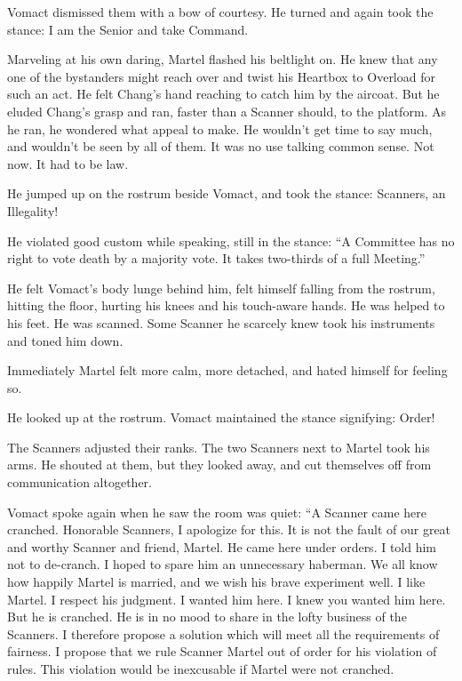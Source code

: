 Vomact dismissed them with a bow of courtesy. He turned and again took the stance: I am the Senior and take Command.

Marveling at his own daring, Martel flashed his beltlight on. He knew that any one of the bystanders might reach over and twist his Heartbox to Overload for such an act. He felt Chang's hand reaching to catch him by the aircoat. But he eluded Chang's grasp and ran, faster than a Scanner should, to the platform. As he ran, he wondered what appeal to make. He wouldn't get time to say much, and wouldn't be seen by all of them. It was no use talking common sense. Not now. It had to be law.

He jumped up on the rostrum beside Vomact, and took the stance: Scanners, an Illegality!

He violated good custom while speaking, still in the stance: ``A Committee has no right to vote death by a majority vote. It takes two-thirds of a full Meeting.''

He felt Vomact's body lunge behind him, felt himself falling from the rostrum, hitting the floor, hurting his knees and his touch-aware hands. He was helped to his feet. He was scanned. Some Scanner he scarcely knew took his instruments and toned him down.

Immediately Martel felt more calm, more detached, and hated himself for feeling so.

He looked up at the rostrum. Vomact maintained the stance signifying: Order!

The Scanners adjusted their ranks. The two Scanners next to Martel took his arms. He shouted at them, but they looked away, and cut themselves off from communication altogether.

Vomact spoke again when he saw the room was quiet: ``A Scanner came here cranched. Honorable Scanners, I apologize for this. It is not the fault of our great and worthy Scanner and friend, Martel. He came here under orders. I told him not to de-cranch. I hoped to spare him an unnecessary haberman. We all know how happily Martel is married, and we wish his brave experiment well. I like Martel. I respect his judgment. I wanted him here. I knew you wanted him here. But he is cranched. He is in no mood to share in the lofty business of the Scanners. I therefore propose a solution which will meet all the requirements of fairness. I propose that we rule Scanner Martel out of order for his violation of rules. This violation would be inexcusable if Martel were not cranched.

